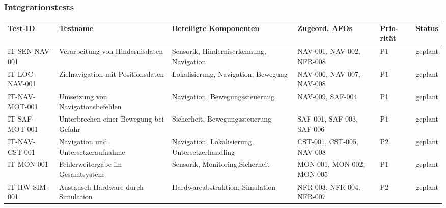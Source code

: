 \subsubsection{Integrationstests}\label{integrationstests-2}

\begin{longtable}[]{@{}
  >{\raggedright\arraybackslash}p{}
  >{\raggedright\arraybackslash}p{}
  >{\raggedright\arraybackslash}p{}
  >{\raggedright\arraybackslash}p{}
  >{\raggedright\arraybackslash}p{}
  >{\raggedright\arraybackslash}p{}@{}}
\toprule\noalign{}
\begin{minipage}[b]{\linewidth}\raggedright
Test-ID
\end{minipage} & \begin{minipage}[b]{\linewidth}\raggedright
Testname
\end{minipage} & \begin{minipage}[b]{\linewidth}\raggedright
Beteiligte Komponenten
\end{minipage} & \begin{minipage}[b]{\linewidth}\raggedright
Zugeord. AFOs
\end{minipage} & \begin{minipage}[b]{\linewidth}\raggedright
Prio-rität
\end{minipage} & \begin{minipage}[b]{\linewidth}\raggedright
Status
\end{minipage} \\
\midrule\noalign{}
\endhead
\bottomrule\noalign{}
\endlastfoot
IT-SEN-NAV-001 & Verarbeitung von Hindernisdaten & Sensorik,
Hinderniserkennung, Navigation & NAV-001, NAV-002, NFR-008 & P1 &
geplant \\
IT-LOC-NAV-001 & Zielnavigation mit Positionsdaten & Lokalisierung,
Navigation, Bewegung & NAV-006, NAV-007, NAV-008 & P1 & geplant \\
IT-NAV-MOT-001 & Umsetzung von Navigationsbefehlen & Navigation,
Bewegungssteuerung & NAV-009, SAF-004 & P1 & geplant \\
IT-SAF-MOT-001 & Unterbrechen einer Bewegung bei Gefahr & Sicherheit,
Bewegungssteuerung & SAF-001, SAF-003, SAF-006 & P1 & geplant \\
IT-NAV-CST-001 & Navigation und Untersetzeraufnahme & Navigation,
Lokalisierung, Untersetzerhandling & CST-001, CST-005, NAV-008 & P2 &
geplant \\
IT-MON-001 & Fehlerweitergabe im Gesamtsystem & Sensorik,
Monitoring,Sicherheit & MON-001, MON-002, MON-005 & P1 & geplant \\
IT-HW-SIM-001 & Austausch Hardware durch Simulation &
Hardwareabstraktion, Simulation & NFR-003, NFR-004, NFR-007 & P2 &
geplant \\
\end{longtable}

